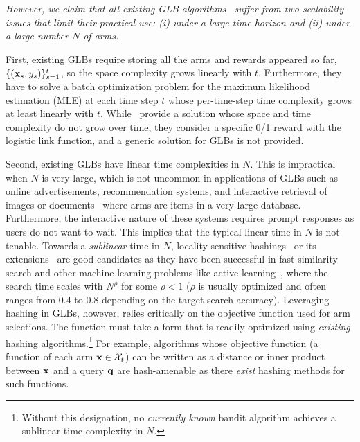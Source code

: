 \textit{However, we claim that all existing GLB algorithms~\cite{filippi10parametric,li17provable} suffer from two scalability issues that limit their practical use: (i) under a large time horizon and (ii) under a large number $N$ of arms.}

First, existing GLBs require storing all the arms and rewards appeared so far, $\{(\mathbf{x}_s,y_s)\}_{s=1}^t$, so the space complexity grows linearly with $t$.
Furthermore, they have to solve a batch optimization problem for the maximum likelihood estimation (MLE) at each time step $t$ whose per-time-step time complexity grows at least linearly with $t$.
While~\citet{zhang16online} provide a solution whose space and time complexity do not grow over time, they consider a specific 0/1 reward with the logistic link function, and a generic solution for GLBs is not provided.


Second, existing GLBs have linear time complexities in $N$.
This is impractical when $N$ is very large, which is not uncommon in applications of GLBs such as online advertisements, recommendation systems, and interactive retrieval of images or documents~\cite{li10acontextual,li12anunbiased,yue12hierarchical,hofmann11contextual,konyushkova13content} where arms are items in a very large database.
Furthermore, the interactive nature of these systems requires prompt responses as users do not want to wait.
This implies that the typical linear time in $N$ is not tenable.
Towards a \emph{sublinear} time in $N$, locality sensitive hashings~\cite{indyk12approximate} or its extensions~\cite{shrivastava14asymmetric,shrivastava15improved,neyshabur15on} are good candidates as they have been successful in fast similarity search and other machine learning problems like active learning~\cite{jain10hashing}, where the search time scales with $N^{\rho}$ for some $\rho<1$ ($\rho$ is usually optimized and often ranges from 0.4 to 0.8 depending on the target search accuracy).
Leveraging hashing in GLBs, however, relies critically on the objective function used for arm selections.
The function must take a form that is readily optimized using \emph{existing} hashing algorithms.\footnote{
  Without this designation, no {\em currently known} bandit algorithm achieves a sublinear time complexity in $N$.%
}
For example, algorithms whose objective function (a function of each arm $\mathbf{x}\in\mathcal{X}_t$) can be written as a distance or inner product between $\mathbf{x}$ and a query ${{\mathbf q}}$ are hash-amenable as there \emph{exist} hashing methods for such functions.

